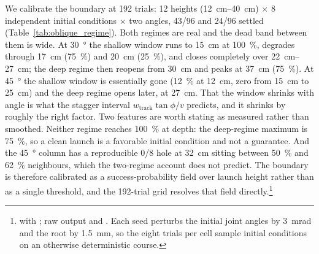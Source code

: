 \documentclass[a4paper,fleqn]{cas-dc}
\begin{document}
We calibrate the boundary at \num{192} trials: \num{12} heights
(\SIrange{12}{40}{cm}) ${\times}$ \num{8} independent initial conditions
${\times}$ two angles, \num{43}/\num{96} and \num{24}/\num{96} settled
(Table~\ref{tab:oblique_regime}). Both regimes are real and the dead band
between them is wide. At \SI{30}{\degree} the shallow window runs to
\SI{15}{cm} at \SI{100}{\percent}, degrades through \SI{17}{cm}
(\SI{75}{\percent}) and \SI{20}{cm} (\SI{25}{\percent}), and closes completely
over \SIrange{22}{27}{cm}; the deep regime then reopens from \SI{30}{cm} and
peaks at \SI{37}{cm} (\SI{75}{\percent}). At \SI{45}{\degree} the shallow window is essentially gone (\SI{12}{\percent} at \SI{12}{cm}, zero from \SI{15}{cm} to \SI{25}{cm}) and the deep regime opens later, at \SI{27}{cm}. That the window
shrinks with angle is what the stagger interval $w_{\text{track}}\tan\phi/v$
predicts, and it shrinks by roughly the right factor.
Two features are worth stating as measured rather than smoothed. Neither regime
reaches \SI{100}{\percent} at depth: the deep-regime maximum is
\SI{75}{\percent}, so a clean launch is a favorable initial condition and not a
guarantee. And the \SI{45}{\degree} column has a reproducible \num{0}/\num{8}
hole at \SI{32}{cm} sitting between \SI{50}{\percent} and \SI{62}{\percent}
neighbours, which the two-regime account does not predict. The boundary is
therefore calibrated as a success-probability field over launch height rather
than as a single threshold, and the \num{192}-trial grid resolves that field
directly.\footnote{
with ; raw output  and
. Each seed perturbs the initial joint angles by
\SI{3}{mrad} and the root by \SI{1.5}{mm}, so the eight trials per cell sample
initial conditions on an otherwise deterministic course.}
\end{document}

